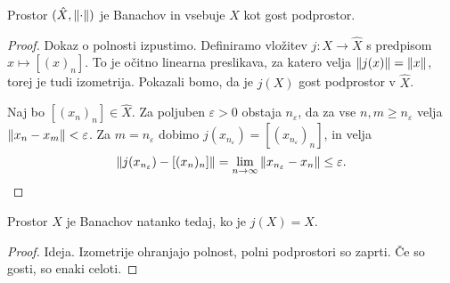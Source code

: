 \begin{izrek}
  Prostor $(\hat{X}, \left\lVert\cdot\right\rVert)$ je Banachov in vsebuje $X$ kot gost
  podprostor.
\end{izrek}

\begin{proof}
  Dokaz o polnosti izpustimo.
  Definiramo vložitev $j: X \to \hat{X}$ s predpisom $x \mapsto [(x)_n]$.
  To je očitno linearna preslikava, za katero velja $\left\lVert j(x)\right\rVert = \left\lVert x\right\rVert$,
  torej je tudi izometrija.
  Pokazali bomo, da je $j(X)$ gost podprostor v $\hat{X}$.

  Naj bo $[(x_n)_n] \in \hat{X}$.
  Za poljuben $\varepsilon > 0$ obstaja $n_\varepsilon$, da za vse $n, m \ge
  n_\varepsilon$ velja $\left\lVert x_n - x_m\right\rVert < \varepsilon$.
  Za $m = n_\varepsilon$ dobimo $j(x_{n_\varepsilon}) =
  [(x_{n_\varepsilon})_n]$, in velja
  \[
	\left\lVert j(x_{n_\varepsilon}) - [(x_n)_n]\right\rVert = \lim_{n \to \infty}
	\left\lVert x_{n_\varepsilon} - x_n\right\rVert \le \varepsilon.
	\qedhere
  \]
\end{proof}

\begin{posledica}
  Prostor $X$ je Banachov natanko tedaj, ko je $j(X) = \hat{X}$.
\end{posledica}

\begin{proof}
  Ideja.
  Izometrije ohranjajo polnost, polni podprostori so zaprti.
  Če so gosti, so enaki celoti.
\end{proof}

